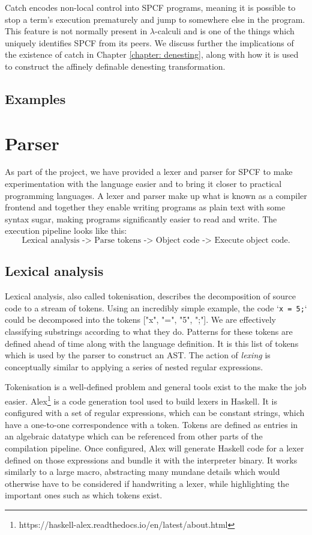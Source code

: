\documentclass[12pt,a4paper]{report}
\theoremstyle{definition}
\theoremstyle{remark}
\begin{document}
Catch encodes non-local control into SPCF programs, meaning it is possible to stop a term's execution prematurely and jump to somewhere else in the program. This feature is not normally present in $\lambda$-calculi and is one of the things which uniquely identifies SPCF from its peers. We discuss further the implications of the existence of catch in Chapter \ref{chapter: denesting}, along with how it is used to construct the affinely definable denesting transformation.

\subsection{Examples}

\section{Parser}
As part of the project, we have provided a lexer and parser for SPCF to make experimentation with the language easier and to bring it closer to practical programming languages. A lexer and parser make up what is known as a compiler frontend and together they enable writing programs as plain text with some syntax sugar, making programs significantly easier to read and write. The execution pipeline looks like this:
\[\text{Lexical analysis -> Parse tokens -> Object code -> Execute object code}.\]
\subsection{Lexical analysis}
Lexical analysis, also called tokenisation, describes the decomposition of source code to a stream of tokens. Using an incredibly simple example, the code `\lstinline{x = 5;}` could be decomposed into the tokens ["x", "=", "5", ";"]. We are effectively classifying substrings according to what they do. Patterns for these tokens are defined ahead of time along with the language definition. It is this list of tokens which is used by the parser to construct an AST. The action of \emph{lexing} is conceptually similar to applying a series of nested regular expressions.

Tokenisation is a well-defined problem and general tools exist to the make the job easier. Alex\footnote{https://haskell-alex.readthedocs.io/en/latest/about.html} is a code generation tool used to build lexers in Haskell. It is configured with a set of regular expressions, which can be constant strings, which have a one-to-one correspondence with a token. Tokens are defined as entries in an algebraic datatype which can be referenced from other parts of the compilation pipeline. Once configured, Alex will generate Haskell code for a lexer defined on those expressions and bundle it with the interpreter binary. It works similarly to a large macro, abstracting many mundane details 
which would otherwise have to be considered if handwriting a lexer, while highlighting the important ones such as which tokens exist.
\end{document}
